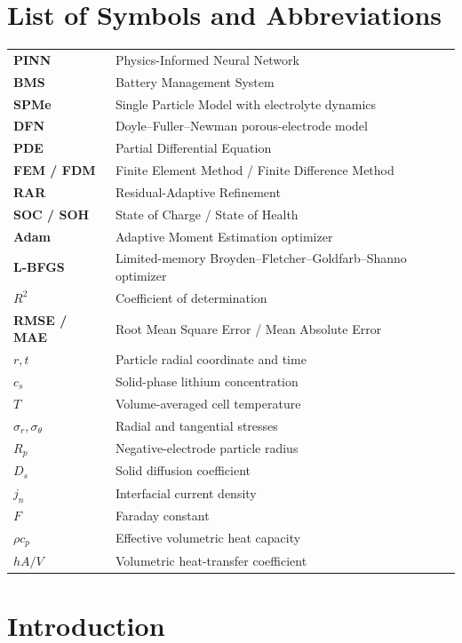 \documentclass[14pt,a4paper,oneside]{extreport}
\begin{document}
\chapter*{List of Symbols and Abbreviations}
\begin{longtable}{>{\bfseries}p{}p{}}
PINN & Physics-Informed Neural Network\\
BMS & Battery Management System\\
SPMe & Single Particle Model with electrolyte dynamics\\
DFN & Doyle--Fuller--Newman porous-electrode model\\
PDE & Partial Differential Equation\\
FEM / FDM & Finite Element Method / Finite Difference Method\\
RAR & Residual-Adaptive Refinement\\
SOC / SOH & State of Charge / State of Health\\
Adam & Adaptive Moment Estimation optimizer\\
L-BFGS & Limited-memory Broyden--Fletcher--Goldfarb--Shanno optimizer\\
$R^2$ & Coefficient of determination\\
RMSE / MAE & Root Mean Square Error / Mean Absolute Error\\
$r,t$ & Particle radial coordinate and time\\
$c_s$ & Solid-phase lithium concentration\\
$T$ & Volume-averaged cell temperature\\
$\sigma_r,\sigma_{\theta}$ & Radial and tangential stresses\\
$R_p$ & Negative-electrode particle radius\\
$D_s$ & Solid diffusion coefficient\\
$j_n$ & Interfacial current density\\
$F$ & Faraday constant\\
$\rho c_p$ & Effective volumetric heat capacity\\
$hA/V$ & Volumetric heat-transfer coefficient\\
\end{longtable}

\clearpage
{}
\setcounter{page}{1}

\chapter{Introduction}
\end{document}
